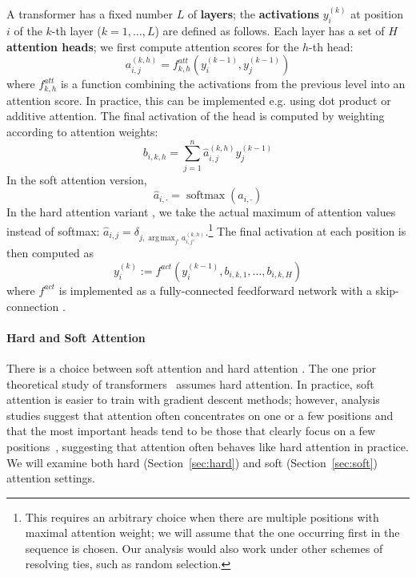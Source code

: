 \documentclass[11pt,a4paper]{article}
\DeclareMathOperator*{\argmax}{arg\,max}
\newcommand{\key}[1]{\textbf{#1}}
\begin{document}
A transformer has a fixed number $L$ of \key{layers}; the \key{activations} $y_i^{(k)}$ at position $i$ of the $k$-th layer ($k=1, \dots, L$) are defined as follows.
Each layer has a set of $H$ \key{attention heads}; we first compute attention scores for the $h$-th head:
\begin{equation}
    a_{i,j}^{(k,h)} = f^{att}_{k,h}\left(y_i^{(k-1)}, y_j^{(k-1)}\right)
\end{equation}
where $f^{att}_{k,h}$ is a function combining the activations from the previous level into an attention score.
In practice, this can be implemented e.g. using dot product or additive attention.
The final activation of the head is computed by weighting according to attention weights:
\begin{equation}
    b_{i,k,h} = \sum_{j=1}^n \hat{a}_{i,j}^{(k,h)} y_j^{(k-1)}
\end{equation}
In the soft attention version,
$$ \hat{a}_{i,\cdot} = \operatorname{softmax}(a_{i,\cdot}) $$
In the hard attention variant \cite{perez2019turing} , we take the actual maximum of attention values instead of softmax:
$\hat{a}_{i,j} = \delta_{j, \argmax_{j'} a_{i,j'}^{(k,h)}}$.\footnote{This requires an arbitrary choice when there are multiple positions with maximal attention weight; we will assume that the one occurring first in the sequence is chosen. Our analysis would also work under other schemes of resolving ties, such as random selection.}
The final activation at each position is then computed as
\begin{equation}
    y_i^{(k)} := f^{act}(y_i^{(k-1)}, b_{i,k,1}, \dots, b_{i,k,H})
\end{equation}
where $f^{act}$ is implemented as a fully-connected feedforward network with a skip-connection \cite{vaswani2017attention}.

\paragraph{Hard and Soft Attention}
There is a choice between soft attention and hard attention \cite{shen2018reinforced,perez2019turing}.
The one prior theoretical study of transformers~\cite{perez2019turing} assumes hard attention.
In practice, soft attention is easier to train with gradient descent methods; however, analysis studies suggest that attention often concentrates on one or a few positions \cite{voita2019analyzing,clark2019bert} and that the most important heads tend to be those that clearly focus on a few positions~\cite{voita2019analyzing}, suggesting that attention often behaves  like hard attention in practice. %
We will  examine both hard (Section~\ref{sec:hard}) and soft (Section~\ref{sec:soft}) attention settings.
\end{document}
